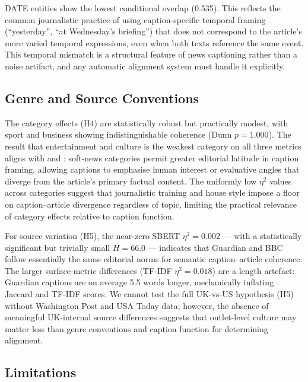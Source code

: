 \documentclass[11pt,a4paper]{article}
\begin{document}
DATE entities show the lowest conditional overlap (0.535). This reflects
the common journalistic practice of using caption-specific temporal
framing (``yesterday'', ``at Wednesday's briefing'') that does not
correspond to the article's more varied temporal expressions, even when
both texts reference the same event. This temporal mismatch is a
structural feature of news captioning rather than a noise artifact, and
any automatic alignment system must handle it explicitly.

\subsection{Genre and Source Conventions}

The category effects (H4) are statistically robust but practically
modest, with sport and business showing indistinguishable coherence
(Dunn $p = 1.000$). The result that entertainment and culture is the
weakest category on all three metrics aligns with \citet{LehmanWilzig2010}
and \citet{Cheema2023}: soft-news categories permit greater editorial
latitude in caption framing, allowing captions to emphasise human
interest or evaluative angles that diverge from the article's primary
factual content. The uniformly low $\eta^2$ values across categories
suggest that journalistic training and house style impose a floor on
caption--article divergence regardless of topic, limiting the
practical relevance of category effects relative to caption function.

For source variation (H5), the near-zero SBERT $\eta^2 = 0.002$ --- with
a statistically significant but trivially small $H = 66.0$ --- indicates
that Guardian and BBC follow essentially the same editorial norms for
semantic caption--article coherence. The larger surface-metric differences
(TF-IDF $\eta^2 = 0.018$) are a length artefact: Guardian captions are
on average 5.5 words longer, mechanically inflating Jaccard and TF-IDF
scores. We cannot test the full UK-vs-US hypothesis (H5) without Washington
Post and USA Today data; however, the absence of meaningful UK-internal
source differences suggests that outlet-level culture may matter less
than genre conventions and caption function for determining alignment.

\subsection{Limitations}
\end{document}
